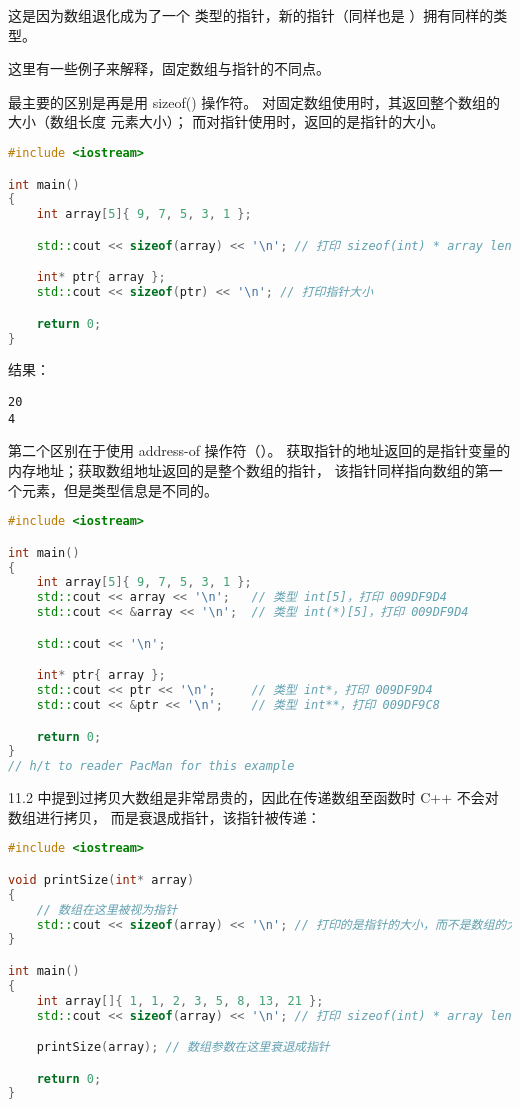 \documentclass[../../LearnCpp.tex]{subfiles}
\begin{document}
这是因为数组退化成为了一个  类型的指针，新的指针（同样也是 ）拥有同样的类型。

这里有一些例子来解释，固定数组与指针的不同点。

最主要的区别是再是用 sizeof() 操作符。
对固定数组使用时，其返回整个数组的大小（数组长度 \* 元素大小）；
而对指针使用时，返回的是指针的大小。

\begin{lstlisting}[language=C++]
#include <iostream>

int main()
{
    int array[5]{ 9, 7, 5, 3, 1 };

    std::cout << sizeof(array) << '\n'; // 打印 sizeof(int) * array length

    int* ptr{ array };
    std::cout << sizeof(ptr) << '\n'; // 打印指针大小

    return 0;
}
\end{lstlisting}

结果：

\begin{lstlisting}
20
4
\end{lstlisting}

第二个区别在于使用 address-of 操作符（\acode{&}）。
获取指针的地址返回的是指针变量的内存地址；获取数组地址返回的是整个数组的指针，
该指针同样指向数组的第一个元素，但是类型信息是不同的。

\begin{lstlisting}[language=C++]
#include <iostream>

int main()
{
    int array[5]{ 9, 7, 5, 3, 1 };
    std::cout << array << '\n';   // 类型 int[5]，打印 009DF9D4
    std::cout << &array << '\n';  // 类型 int(*)[5]，打印 009DF9D4

    std::cout << '\n';

    int* ptr{ array };
    std::cout << ptr << '\n';     // 类型 int*，打印 009DF9D4
    std::cout << &ptr << '\n';    // 类型 int**，打印 009DF9C8

    return 0;
}
// h/t to reader PacMan for this example
\end{lstlisting}

11.2 中提到过拷贝大数组是非常昂贵的，因此在传递数组至函数时 C++ 不会对数组进行拷贝，
而是衰退成指针，该指针被传递：

\begin{lstlisting}[language=C++]
#include <iostream>

void printSize(int* array)
{
    // 数组在这里被视为指针
    std::cout << sizeof(array) << '\n'; // 打印的是指针的大小，而不是数组的大小！
}

int main()
{
    int array[]{ 1, 1, 2, 3, 5, 8, 13, 21 };
    std::cout << sizeof(array) << '\n'; // 打印 sizeof(int) * array length

    printSize(array); // 数组参数在这里衰退成指针

    return 0;
}
\end{lstlisting}
\end{document}

